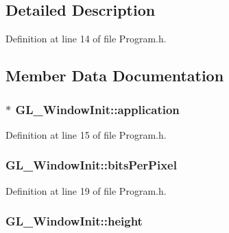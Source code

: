 \subsection{Detailed Description}


Definition at line 14 of file Program.\+h.



\subsection{Member Data Documentation}
\hypertarget{struct_g_l___window_init_afde844f257aafdb31bd03338723a2206}{
\subsubsection[{application}]{$\ast$ G\+L\+\_\+\+Window\+Init\+::application}}\label{struct_g_l___window_init_afde844f257aafdb31bd03338723a2206}


Definition at line 15 of file Program.\+h.

\hypertarget{struct_g_l___window_init_aa4220e9602ef12719a010e049a42fcea}{
\subsubsection[{bits\+Per\+Pixel}]{ G\+L\+\_\+\+Window\+Init\+::bits\+Per\+Pixel}}\label{struct_g_l___window_init_aa4220e9602ef12719a010e049a42fcea}


Definition at line 19 of file Program.\+h.

\hypertarget{struct_g_l___window_init_a8413cf084b2d4e7056da68940ab1438e}{
\subsubsection[{height}]{ G\+L\+\_\+\+Window\+Init\+::height}}\label{struct_g_l___window_init_a8413cf084b2d4e7056da68940ab1438e}


